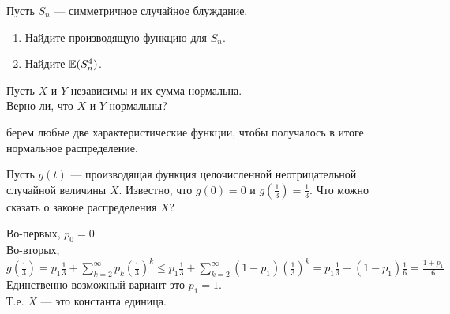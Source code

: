 \begin{problem}
Пусть $S_{n}$ — симметричное случайное блуждание.
\begin{enumerate}
\item Найдите производящую функцию для $S_{n}$.
\item Найдите $\mathbb{E}(S_{n}^{4})$.
\end{enumerate}

\begin{sol}

\end{sol}
\end{problem}

\begin{problem}
Пусть $X$ и $Y$ независимы и их сумма нормальна. \\
Верно ли, что $X$ и $Y$ нормальны?

\begin{sol}
 берем любые две характеристические функции, чтобы получалось в итоге нормальное распределение.
\end{sol}
\end{problem}

\begin{problem}
Пусть $g(t)$ — производящая функция целочисленной неотрицательной случайной величины $X$. Известно, что $g(0)=0$ и $g(\frac{1}{3})=\frac{1}{3}$. Что можно сказать о законе распределения $X$?

\begin{sol}

Во-первых, $p_{0}=0$ \\
Во-вторых, $g(\frac{1}{3})=p_{1}\frac{1}{3}+\sum_{k=2}^{\infty}p_{k}\left(\frac{1}{3}\right)^{k}\le p_{1}\frac{1}{3}+\sum_{k=2}^{\infty}(1-p_{1})\left(\frac{1}{3}\right)^{k}=p_{1}\frac{1}{3}+(1-p_{1})\frac{1}{6}=\frac{1+p_{1}}{6}$ \\
Единственно возможный вариант это $p_{1}=1$. \\
Т.е. $X$ — это константа единица.
\end{sol}
\end{problem}

